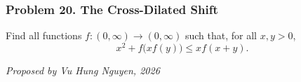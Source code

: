 \subsubsection*{Problem 20. The Cross-Dilated Shift}

\begin{exercisebox}[hard]

Find all functions $f:(0,\infty)\to(0,\infty)$ such that, for all
$x,y>0$,
\[
x^2+f\bigl(xf(y)\bigr)\leq x f(x+y).
\]

\begin{flushright}
\textit{Proposed by Vu Hung Nguyen, 2026}
\end{flushright}


\end{exercisebox}